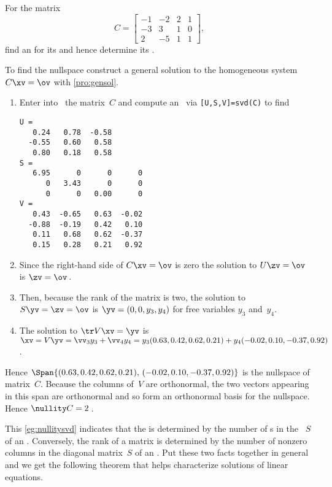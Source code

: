 \begin{example} \label{eg:nullitysvd}
For the matrix
\begin{equation*}
C=\begin{bmatrix} -1&-2&2&1
\\-3&3&1&0
\\2&-5&1&1 \end{bmatrix},
\end{equation*}
find an  for its  and hence determine its .
\begin{solution} 
To find the nullspace construct a general solution to the homogeneous system \(C\xv=\ov\) with \cref{pro:gensol}.
\begin{enumerate}
\item Enter  into \script\ the matrix~\(C\) and compute an \svd\ via \verb|[U,S,V]=svd(C)| to find \twodp
\setbox\ajrqrbox\hbox{}%
\marginajrbox%
\begin{verbatim}
U =
   0.24   0.78  -0.58
  -0.55   0.60   0.58
   0.80   0.18   0.58
S =
   6.95      0      0      0
      0   3.43      0      0
      0      0   0.00      0
V =
   0.43  -0.65   0.63  -0.02
  -0.88  -0.19   0.42   0.10
   0.11   0.68   0.62  -0.37
   0.15   0.28   0.21   0.92
\end{verbatim}
\item Since the right-hand side of \(C\xv=\ov\) is zero the solution to \(U\zv=\ov\) is \(\zv=\ov\)\,.
\item Then, because the rank of the matrix is two, the solution to \(S\yv=\zv=\ov\) is \(\yv=(0,0,y_3,y_4)\) for free variables \(y_3\) and~\(y_4\).
\item The solution to \(\tr V\xv=\yv\) is \(\xv=V\yv=\vv_3y_3+\vv_4y_4
=y_3(0.63,0.42,0.62,0.21)+y_4(-0.02,0.10,-0.37,0.92)\).
\end{enumerate}
Hence  \(\Span\{(0.63,0.42,0.62,0.21),\,(-0.02,0.10,-0.37,0.92)\}\) is the nullspace of matrix~\(C\).
Because the columns of~\(V\) are orthonormal, the two vectors appearing in this span are orthonormal and so form an orthonormal basis for the nullspace.
Hence \(\nullity C=2\)\,.
\end{solution}
\end{example}



This \cref{eg:nullitysvd} indicates that the  is determined by the number of s in the ~\(S\) of an \svd.
Conversely, the rank of a matrix is determined by the number of nonzero columns in the diagonal matrix~\(S\) of an \svd.
Put these two facts together in general and we get the following theorem that helps characterize solutions of linear equations.





